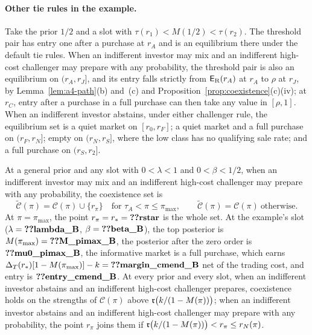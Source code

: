 \paragraph{Other tie rules in the example.}
Take the prior \(1/2\) and a slot with \(\tau(r_1)<M(1/2)<\tau(r_2)\). The threshold pair has entry one after a
purchase at \(r_A\) and is an equilibrium there under the default tie rules. When an indifferent investor may mix and
an indifferent high-cost challenger may prepare with any probability, the threshold pair is also an equilibrium on
\((r_A,r_J]\), and its entry falls strictly from \(\mathsf{E}_{\rm R}(r_A)\) at \(r_A\) to \(\rho\) at \(r_J\), by
Lemma~\ref{lem:a4-path}(b) and~(c) and Proposition~\ref{prop:coexistence}(c)(iv); at \(r_C\), entry after a purchase in
a full purchase can then take any value in \([\rho,1]\). When an indifferent investor abstains, under either
challenger rule, the equilibrium set is a quiet market on \([r_0,r_F]\); a quiet market and a full purchase on
\((r_F,r_N]\); empty on \((r_N,r_S]\), where the low class has no qualifying sale rate; and a full purchase on
\((r_S,r_2]\).

At a general prior and any slot with \(0<\lambda<1\) and \(0<\beta<1/2\), when an indifferent investor may mix and an
indifferent high-cost challenger may prepare with any probability, the coexistence set is
\[
\widetilde{\mathcal C}(\pi)=\mathcal C(\pi)\cup\{r_\pi\}\quad\text{for }\tau_A<\pi\le\pi_{\max},\qquad
\widetilde{\mathcal C}(\pi)=\mathcal C(\pi)\ \text{otherwise}.
\]
At \(\pi=\pi_{\max}\), the point \(r_\pi=r_*=\reg{rstar}\) is the whole set. At the example's slot
(\(\lambda=\reg{lambda_B}\), \(\beta=\reg{beta_B}\)), the top posterior is \(M(\pi_{\max})=\reg{M_pimax_B}\), the
posterior after the zero order is \(\reg{mu0_pimax_B}\), the informative market is a full purchase, which earns
\(\DT(r_*)[1-M(\pi_{\max})]-k=\reg{margin_cmend_B}\) net of the trading cost, and entry is \(\reg{entry_cmend_B}\). At every
prior and every slot, when an indifferent investor abstains and an indifferent high-cost challenger prepares,
coexistence holds on the strengths of \(\mathcal C(\pi)\) above \(\mathfrak{r}\bigl(k/(1-M(\pi))\bigr)\); when an indifferent
investor abstains and an indifferent high-cost challenger may prepare with any probability, the point \(r_\pi\) joins
them if \(\mathfrak{r}\bigl(k/(1-M(\pi))\bigr)<r_\pi\le r_N(\pi)\).

